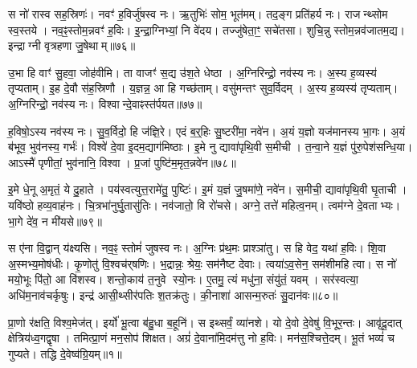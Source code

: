 स नो॑ रास्व सह॒स्रिणः॑।
नवꣳ॑ ह॒विर्जु॑षस्व नः।
ऋ॒तुभिः॑ सोम॒ भूत॑मम्।
तद॒ङ्ग प्रति॑हर्य नः।
राजन्थ्सोम स्व॒स्तये।
नव॒ꣴ॒स्तोम॒न्नवꣳ॑ ह॒विः।
इ॒न्द्रा॒ग्निभ्यां॒ नि वे॑दय।
तज्जु॑षेता॒ꣳ॒ सचे॑तसा।
शुचि॒न्नु स्तोम॒न्नव॑जातम॒द्य।
इन्द्राग्नी वृत्रहणा जु॒षेथाम्॥७६॥

उ॒भा हि वाꣳ॑ सु॒हवा॒ जोह॑वीमि।
ता वाजꣳ॑ स॒द्य उ॑श॒ते धेष्ठा।
अ॒ग्निरिन्द्रो॒ नव॑स्य नः।
अ॒स्य ह॒व्यस्य॑ तृप्यताम्।
इ॒ह दे॒वौ स॑ह॒स्रिणौ।
य॒ज्ञन्न॒ आ हि गच्छ॑ताम्।
वसु॑मन्तꣳ सुव॒र्विदम्।
अ॒स्य ह॒व्यस्य॑ तृप्यताम्।
अ॒ग्निरिन्द्रो॒ नव॑स्य नः।
विश्वान्दे॒वाꣴस्त॑र्पयत॥७७॥

ह॒विषो॒ऽस्य नव॑स्य नः।
सु॒व॒र्विदो॒ हि ज॑ज्ञि॒रे।
एदं ब॒र्॒हिः सु॒ष्टरी॑मा॒ नवे॑न।
अ॒यं य॒ज्ञो यज॑मानस्य भा॒गः।
अ॒यं ब॑भूव॒ भुव॑नस्य॒ गर्भः॑।
विश्वे॑ दे॒वा इ॒दम॒द्याग॑मिष्ठाः।
इ॒मे नु द्यावा॑पृथि॒वी स॒मीची।
त॒न्वा॒ने य॒ज्ञं पु॑रु॒पेश॑सन्धि॒या।
आऽस्मै॑ पृणीतां॒ भुव॑नानि॒ विश्वा।
प्र॒जां पुष्टि॑म॒मृत॒न्नवे॑न॥७८॥

इ॒मे धे॒नू अ॒मृतं॒ ये दु॒हाते।
पय॑स्वत्युत्त॒रामे॑तु॒ पुष्टिः॑।
इ॒मं य॒ज्ञं जु॒षमा॑णे॒ नवे॑न।
स॒मीची॒ द्यावा॑पृथि॒वी घृ॒ताची।
यवि॑ष्ठो हव्य॒वाह॑नः।
चि॒त्रभा॑नुर्घु॒तासु॑तिः।
नव॑जातो॒ वि रो॑चसे।
अग्ने॒ तत्ते॑ महित्व॒नम्।
त्वम॑ग्ने दे॒वताभ्यः।
भा॒गे दे॑व॒ न मी॑यसे॥७९॥

स ए॑ना वि॒द्वान् य॑क्ष्यसि।
नव॒ꣴ॒ स्तोमं॑ जुषस्व नः।
अ॒ग्निः प्र॑थ॒मः प्राश्ञा॑तु।
स हि वेद॒ यथा॑ ह॒विः।
शि॒वा अ॒स्मभ्य॒मोष॑धीः।
कृ॒णोतु॑ वि॒श्वच॑र्‌\mbox{}षणिः।
भ॒द्रान्नः॒ श्रेयः॒ सम॑नैष्ट देवाः।
त्वया॑\-ऽव॒सेन॒ सम॑शीमहि त्वा।
स नो॑ मयो॒भूः पि॑तो॒ आ वि॑शस्व।
शन्तो॒काय॑ त॒नुवे स्यो॒नः।
ए॒तमु॒ त्यं मधु॑ना॒ संयु॑तं॒ यवम्।
सर॑स्वत्या॒ अधि॑म॒नाव॑चर्कृषुः।
इन्द्र॑ आसी॒थ्सीर॑पतिः श॒तक्र॑तुः।
की॒नाशा॑ आसन्म॒रुतः॑ सु॒दान॑वः॥८०॥\anuvakamend[पु॒र॒ए॒ता वृ॑णीमहे जु॒षेथान्तर्पयता॒मृत॒न्नवे॑न मीयसे स्यो॒नश्च॒त्वारि॑ च]




\clearpage
{}
\setcounter{anuvakam}{0}

प्रा॒णो र॑क्षति॒ विश्व॒मेज॑त्।
इर्यो॑ भू॒त्वा ब॑हु॒धा ब॒हूनि॑।
स इथ्सर्वं॒ व्या॑नशे।
यो दे॒वो दे॒वेषु॑ वि॒भूर॒न्तः।
आवृ॑दू॒दात् क्षेत्रिय॑ध्व॒गद्वृषा।
तमित्प्रा॒णं मन॒सोप॑ शिक्षत।
अग्रं॑ दे॒वाना॑मि॒दम॑त्तु नो ह॒विः।
मन॑स॒श्चित्ते॒दम्।
भू॒तं भव्यं॑ च गुप्यते।
तद्धि दे॒वेष्व॑ग्रि॒यम्॥१॥

